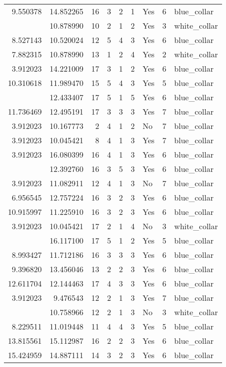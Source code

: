 \documentclass[
]{article}
\begin{document}
\begin{longtable}[t]{rrrrrllrl}
9.550378 & 14.852265 & 16 & 3 & 2 & 1 & Yes & 6 & blue\_collar\\
\addlinespace
3.912023 & 10.878990 & 10 & 2 & 1 & 2 & Yes & 3 & white\_collar\\
8.527143 & 10.520024 & 12 & 5 & 4 & 3 & Yes & 6 & blue\_collar\\
7.882315 & 10.878990 & 13 & 1 & 2 & 4 & Yes & 2 & white\_collar\\
3.912023 & 14.221009 & 17 & 3 & 1 & 2 & Yes & 6 & blue\_collar\\
10.310618 & 11.989470 & 15 & 5 & 4 & 3 & Yes & 5 & blue\_collar\\
\addlinespace
3.912023 & 12.433407 & 17 & 5 & 1 & 5 & Yes & 6 & blue\_collar\\
11.736469 & 12.495191 & 17 & 3 & 3 & 3 & Yes & 7 & blue\_collar\\
3.912023 & 10.167773 & 2 & 4 & 1 & 2 & No & 7 & blue\_collar\\
3.912023 & 10.045421 & 8 & 4 & 1 & 3 & Yes & 7 & blue\_collar\\
3.912023 & 16.080399 & 16 & 4 & 1 & 3 & Yes & 6 & blue\_collar\\
\addlinespace
6.109248 & 12.392760 & 16 & 3 & 5 & 3 & Yes & 6 & blue\_collar\\
3.912023 & 11.082911 & 12 & 4 & 1 & 3 & No & 7 & blue\_collar\\
6.956545 & 12.757224 & 16 & 3 & 2 & 3 & Yes & 6 & blue\_collar\\
10.915997 & 11.225910 & 16 & 3 & 2 & 3 & Yes & 6 & blue\_collar\\
3.912023 & 10.045421 & 17 & 2 & 1 & 4 & No & 3 & white\_collar\\
\addlinespace
3.912023 & 16.117100 & 17 & 5 & 1 & 2 & Yes & 5 & blue\_collar\\
8.993427 & 11.712186 & 16 & 3 & 3 & 3 & Yes & 6 & blue\_collar\\
9.396820 & 13.456046 & 13 & 2 & 2 & 3 & Yes & 6 & blue\_collar\\
12.611704 & 12.144463 & 17 & 4 & 3 & 3 & Yes & 6 & blue\_collar\\
3.912023 & 9.476543 & 12 & 2 & 1 & 3 & Yes & 7 & blue\_collar\\
\addlinespace
3.912023 & 10.758966 & 12 & 2 & 1 & 3 & No & 3 & white\_collar\\
8.229511 & 11.019448 & 11 & 4 & 4 & 3 & Yes & 5 & blue\_collar\\
13.815561 & 15.112987 & 16 & 2 & 2 & 3 & Yes & 6 & blue\_collar\\
15.424959 & 14.887111 & 14 & 3 & 2 & 3 & Yes & 6 & blue\_collar\\

\end{longtable}
\end{document}
